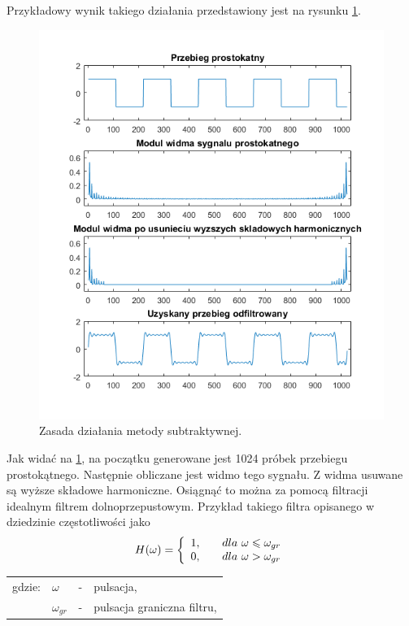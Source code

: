 Przykładowy wynik takiego działania przedstawiony jest na rysunku \ref{rys:sub_wykres1}.
\begin{figure}[H]
	\centering
	\includegraphics[width=12cm]{grafiki/sub_wykres1}
	\captionsetup{justification=centering}
	\caption{Zasada działania metody subtraktywnej.}
	\label{rys:sub_wykres1}
\end{figure}
Jak widać na \ref{rys:sub_wykres1}, na początku generowane jest 1024 próbek przebiegu prostokątnego. Następnie obliczane jest widmo tego sygnału. Z widma usuwane są wyższe składowe harmoniczne. Osiągnąć to można za pomocą filtracji idealnym filtrem dolnoprzepustowym. Przykład takiego filtra opisanego w dziedzinie częstotliwości jako
\begin{equation} \label{equ:sub_lowpass}
H(\omega)=\left \{\begin{array}{ r l }
1, & \quad \text{$dla$ } \omega \leqslant \omega_{gr}\\
0, & \quad  \text{$dla$ } \omega > \omega_{gr}
\end{array}
\right.
\end{equation}
\begin{tabular}{ l l l l}
	gdzie: & $\omega$ &  - & pulsacja, \\
	&	$\omega_{gr}$ & - &  pulsacja graniczna filtru,\\
\end{tabular} \\ \\
